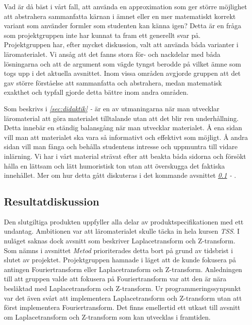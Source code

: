 \documentclass[12pt,a4paper,twoside,openright]{article}
\begin{document}
Vad är då bäst i vårt fall, att använda en approximation som ger
större möjlighet att abstrahera
sammanfatta kärnan i ämnet eller
en mer matematiskt korrekt variant som använder formler som studenten
kan känna igen? Detta är en fråga som projektgruppen inte har kunnat
ta fram ett generellt svar på. Projektgruppen har, efter mycket
diskussion, valt att använda båda varianter i läromaterialet. Vi ansåg
att det fanns stora för- och nackdelar med båda lösningarna och att de
argument som vägde tyngst berodde på vilket ämne som togs upp i det
aktuella avsnittet. Inom vissa områden avgjorde gruppen att det gav
större förståelse att sammanfatta och abstrahera, medan matematisk
exakthet och typfall gjorde detta bättre inom andra områden.

Som beskrivs i \textit{\ref{sec:didaktik} - } är en av
utmaningarna när man utvecklar läromaterial att göra materialet
tilltalande utan att det blir ren underhållning. Detta innebär en
ständig balansgång när man utvecklar materialet. Å ena sidan vill man
att materialet ska vara så informativt och effektivt som möjligt. Å
andra sidan vill man fånga och behålla studentens intresse och
uppmuntra till vidare inlärning. Vi har i vårt material strävat efter
att beakta båda sidorna och försökt hålla en lättsam och lätt
humoristisk ton utan att överskugga det faktiska innehållet. Mer om
hur detta gått diskuteras i det kommande avsnittet \textit{\ref{sec:resDisk} - }.

\subsection{Resultatdiskussion}
\label{sec:resDisk}
Den slutgiltiga produkten uppfyller alla delar av
produktspecifikationen med ett undantag. Ambitionen var att
läromaterialet skulle täcka in hela kursen \textit{TSS}. I nuläget
saknas dock avsnitt som beskriver Laplacetransform och
Z-transform. Som nämns i avsnittet \textit{Metod} prioriterades
detta bort på grund av tidsbrist i slutet av projektet. Projektgruppen
hamnade i läget att de kunde fokusera på antingen Fouriertransform
eller Laplacetransform och Z-transform. Anledningen till att
gruppen valde att fokusera på Fouriertransform var att den är nära
besläktad med Laplacetransform och Z-transform. Ur
programmeringssynpunkt var det även svårt att implementera
Laplacetransform och Z-transform utan att först implementera Fouriertransform. Det finns emellertid ett utkast
till avsnitt om Laplacetransform och Z-transform som kan utvecklas i framtiden.
\end{document}
